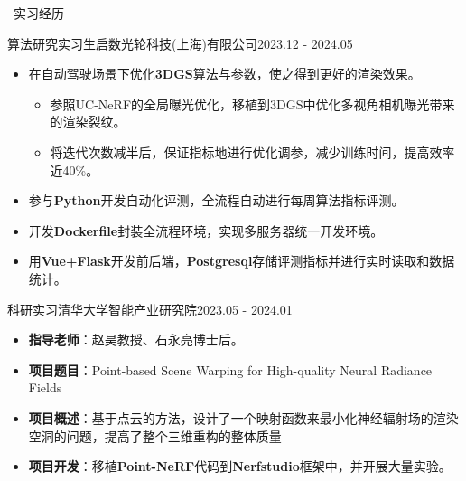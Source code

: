 \documentclass[UTF8]{resume}
\begin{document}
\begin{rSection}{\faBriefcase~实习经历}
    \begin{rExperience}{算法研究实习生}{启数光轮科技(上海)有限公司}{2023.12 - 2024.05}
        \begin{itemize}
            \itemsep -0.5em \vspace{-0.5em}
            \item 在自动驾驶场景下优化\textbf{3DGS}算法与参数，使之得到更好的渲染效果。
            \begin{itemize}
                \item 参照UC-NeRF的全局曝光优化，移植到3DGS中优化多视角相机曝光带来的渲染裂纹。
                \item 将迭代次数减半后，保证指标地进行优化调参，减少训练时间，提高效率近40\%。
            \end{itemize}
            \item 参与\textbf{Python}开发自动化评测，全流程自动进行每周算法指标评测。
            \item 开发\textbf{Dockerfile}封装全流程环境，实现多服务器统一开发环境。
            \item 用\textbf{Vue+Flask}开发前后端，\textbf{Postgresql}存储评测指标并进行实时读取和数据统计。
        \end{itemize}
    \end{rExperience}

    \begin{rExperience}{科研实习}{清华大学智能产业研究院}{2023.05 - 2024.01}
        \begin{itemize}
            \itemsep -0.5em \vspace{-0.5em}
            \item \textbf{指导老师}：赵昊教授、石永亮博士后。
            \item \textbf{项目题目}：Point-based Scene Warping for High-quality Neural Radiance Fields
            \item \textbf{项目概述}：基于点云的方法，设计了一个映射函数来最小化神经辐射场的渲染空洞的问题，提高了整个三维重构的整体质量
            \item \textbf{项目开发}：移植\textbf{Point-NeRF}代码到\textbf{Nerfstudio}框架中，并开展大量实验。
        \end{itemize}
    \end{rExperience}
\end{rSection}
\end{document}
